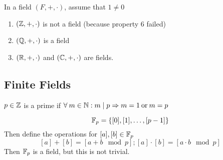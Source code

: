 \begin{remark}
    In a field \((F, +, \cdot)\), assume that \(1\neq 0\)
\end{remark}
\begin{example}
    \hfill
    \begin{enumerate}
        \item \((\mathbb{Z}, +, \cdot)\) is not a field (because property 6 failed)
        \item  \((\mathbb{Q}, +, \cdot)\) is a field
        \item \((\mathbb{R}, +, \cdot)\) and \((\mathbb{C}, +, \cdot)\) are fields.
    \end{enumerate}
\end{example}

\subsection{Finite Fields}
\begin{recall}
    \(p\in \mathbb{Z}\) is a prime if \(\forall m\in \bbn: m \mid p \implies m = 1 \:\text{or}\:  m = p\)
\end{recall}
\begin{definition} 
    \[
        \mathbb{F}_p = \{[0], [1], \dots, [p-1]\}
    \]
    Then define the operations for \([a], [b] \in \mathbb{F}_p\)
    \[
        [a] + [b] = [a + b \mod p]; [a] \cdot [b] = [a \cdot b \mod p]
    \]
    Then \(\mathbb{F}_p\) is a field, but this is not trivial.
\end{definition}


